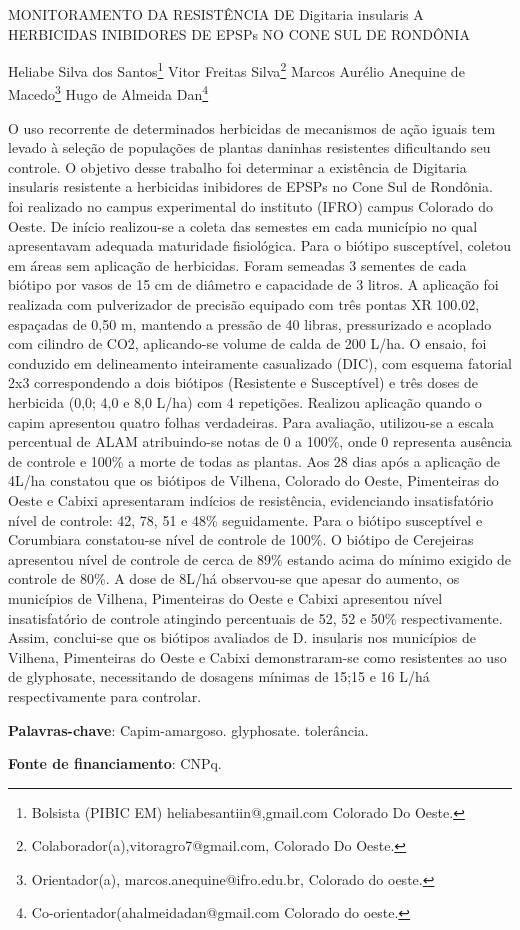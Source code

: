 \documentclass[article,12pt,onesidea,4paper,english,brazil]{abntex2}
\begin{document}
	
	
	\frenchspacing 
	
	\begin{center}
		\LARGE MONITORAMENTO DA RESISTÊNCIA DE Digitaria insularis A HERBICIDAS
		INIBIDORES DE EPSPs NO CONE SUL DE RONDÔNIA
		
		\normalsize
		Heliabe Silva dos Santos\footnote{Bolsista (PIBIC EM) heliabesantiin@,gmail.com Colorado Do Oeste.} 
		Vitor Freitas Silva\footnote{Colaborador(a),vitoragro7@gmail.com, Colorado Do Oeste.} 
		Marcos Aurélio Anequine de Macedo\footnote{Orientador(a), marcos.anequine@ifro.edu.br, Colorado do oeste.} 
	Hugo de Almeida Dan\footnote{Co-orientador(ahalmeidadan@gmail.com Colorado do oeste.} 
	\end{center}
	
	\noindent  O uso recorrente de determinados herbicidas de mecanismos de ação iguais tem
	levado à seleção de populações de plantas daninhas resistentes dificultando seu
	controle. O objetivo desse trabalho foi determinar a existência de Digitaria insularis
	resistente a herbicidas inibidores de EPSPs no Cone Sul de Rondônia. foi realizado
	no campus experimental do instituto (IFRO) campus Colorado do Oeste. De início
	realizou-se a coleta das semestes em cada município no qual apresentavam
	adequada maturidade fisiológica. Para o biótipo susceptível, coletou em áreas sem
	aplicação de herbicidas. Foram semeadas 3 sementes de cada biótipo por vasos de
	15 cm de diâmetro e capacidade de 3 litros. A aplicação foi realizada com
	pulverizador de precisão equipado com três pontas XR 100.02, espaçadas de 0,50
	m, mantendo a pressão de 40 libras, pressurizado e acoplado com cilindro de CO2,
	aplicando-se volume de calda de 200 L/ha. O ensaio, foi conduzido em delineamento
	inteiramente casualizado (DIC), com esquema fatorial 2x3 correspondendo a dois
	biótipos (Resistente e Susceptível) e três doses de herbicida (0,0; 4,0 e 8,0 L/ha)
	com 4 repetições. Realizou aplicação quando o capim apresentou quatro folhas
	verdadeiras. Para avaliação, utilizou-se a escala percentual de ALAM atribuindo-se
	notas de 0 a 100\%, onde 0 representa ausência de controle e 100\% a morte de
	todas as plantas. Aos 28 dias após a aplicação de 4L/ha constatou que os biótipos
	de Vilhena, Colorado do Oeste, Pimenteiras do Oeste e Cabixi apresentaram
	indícios de resistência, evidenciando insatisfatório nível de controle: 42, 78, 51 e
	48\% seguidamente. Para o biótipo susceptível e Corumbiara constatou-se nível de
	controle de 100\%. O biótipo de Cerejeiras apresentou nível de controle de cerca de
	89\% estando acima do mínimo exigido de controle de 80\%. A dose de 8L/há
	observou-se que apesar do aumento, os municípios de Vilhena, Pimenteiras do
	Oeste e Cabixi apresentou nível insatisfatório de controle atingindo percentuais de
	52, 52 e 50\% respectivamente. Assim, conclui-se que os biótipos avaliados de D.
	insularis nos municípios de Vilhena, Pimenteiras do Oeste e Cabixi demonstraram-se
	como resistentes ao uso de glyphosate, necessitando de dosagens mínimas de
	15;15 e 16 L/há respectivamente para controlar.
	
	\vspace{\onelineskip}
	
	\noindent
	\textbf{Palavras-chave}: Capim-amargoso. glyphosate. tolerância.
		\vspace{\onelineskip}
	
	\noindent
	\textbf{Fonte de financiamento}: CNPq.
	
\end{document}
